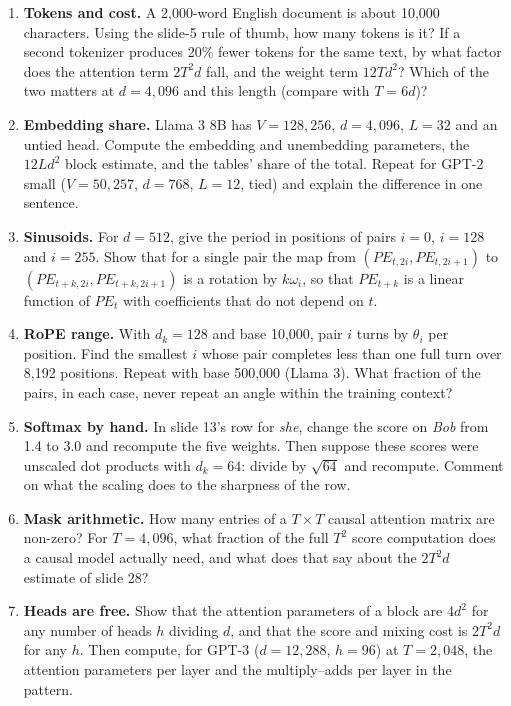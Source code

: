 \documentclass[11pt,letterpaper]{article}
\newcommand{\dk}{d_k}
\begin{document}
\begin{enumerate}[leftmargin=1.6em,itemsep=6pt]
\item \textbf{Tokens and cost.} A 2,000-word English document is about 10,000 characters. Using the slide-5 rule of thumb, how many tokens is it? If a second tokenizer produces 20\% fewer tokens for the same text, by what factor does the attention term $2T^2d$ fall, and the weight term $12Td^2$? Which of the two matters at $d=4{,}096$ and this length (compare with $T=6d$)?
\item \textbf{Embedding share.} Llama 3 8B has $V=128{,}256$, $d=4{,}096$, $L=32$ and an untied head. Compute the embedding and unembedding parameters, the $12Ld^2$ block estimate, and the tables' share of the total. Repeat for GPT-2 small ($V=50{,}257$, $d=768$, $L=12$, tied) and explain the difference in one sentence.
\item \textbf{Sinusoids.} For $d=512$, give the period in positions of pairs $i=0$, $i=128$ and $i=255$. Show that for a single pair the map from $(PE_{t,2i},PE_{t,2i+1})$ to $(PE_{t+k,2i},PE_{t+k,2i+1})$ is a rotation by $k\omega_i$, so that $PE_{t+k}$ is a linear function of $PE_t$ with coefficients that do not depend on $t$.
\item \textbf{RoPE range.} With $\dk=128$ and base 10,000, pair $i$ turns by $\theta_i$ per position. Find the smallest $i$ whose pair completes less than one full turn over 8,192 positions. Repeat with base 500,000 (Llama 3). What fraction of the pairs, in each case, never repeat an angle within the training context?
\item \textbf{Softmax by hand.} In slide 13's row for \emph{she}, change the score on \emph{Bob} from 1.4 to 3.0 and recompute the five weights. Then suppose these scores were unscaled dot products with $\dk=64$: divide by $\sqrt{64}$ and recompute. Comment on what the scaling does to the sharpness of the row.
\item \textbf{Mask arithmetic.} How many entries of a $T\times T$ causal attention matrix are non-zero? For $T=4{,}096$, what fraction of the full $T^2$ score computation does a causal model actually need, and what does that say about the $2T^2d$ estimate of slide 28?
\item \textbf{Heads are free.} Show that the attention parameters of a block are $4d^2$ for any number of heads $h$ dividing $d$, and that the score and mixing cost is $2T^2d$ for any $h$. Then compute, for GPT-3 ($d=12{,}288$, $h=96$) at $T=2{,}048$, the attention parameters per layer and the multiply--adds per layer in the pattern.

\end{enumerate}
\end{document}
